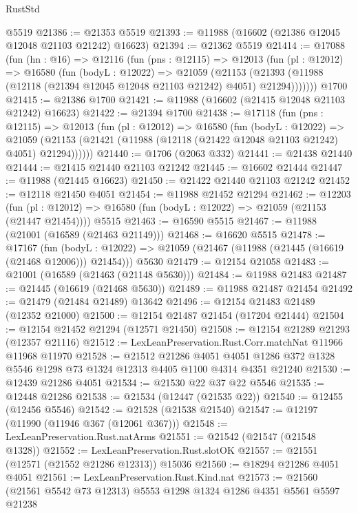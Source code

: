 \begin{lexlean}{RustStd}
\begin{coremodule}
    @5519
@21386 := @21353 @5519
@21393 := @11988 (@16602 (@21386 @12045 @12048 @21103 @21242) @16623)
@21394 := @21362 @5519
@21414 := @17088
    (fun (hn : @16) =>
    @12116
      (fun (pns : @12115) =>
      @12013
        (fun (pl : @12012) =>
        @16580
          (fun (bodyL : @12022) =>
          @21059
            (@21153
              (@21393 (@11988 (@12118 (@21394 @12045 @12048 @21103 @21242) @4051) @21294)))))))
    @1700
@21415 := @21386 @1700
@21421 := @11988 (@16602 (@21415 @12048 @21103 @21242) @16623)
@21422 := @21394 @1700
@21438 := @17118
    (fun (pns : @12115) =>
    @12013
      (fun (pl : @12012) =>
      @16580
        (fun (bodyL : @12022) =>
        @21059 (@21153 (@21421 (@11988 (@12118 (@21422 @12048 @21103 @21242) @4051) @21294))))))
@21440 := @1706 (@2063 @332)
@21441 := @21438 @21440
@21444 := @21415 @21440 @21103 @21242
@21445 := @16602 @21444
@21447 := @11988 (@21445 @16623)
@21450 := @21422 @21440 @21103 @21242
@21452 := @12118 @21450 @4051
@21454 := @11988 @21452 @21294
@21462 := @12203
    (fun (pl : @12012) => @16580 (fun (bodyL : @12022) => @21059 (@21153 (@21447 @21454))))
    @5515
@21463 := @16590 @5515
@21467 := @11988 (@21001 (@16589 (@21463 @21149)))
@21468 := @16620 @5515
@21478 := @17167
    (fun (bodyL : @12022) => @21059 (@21467 (@11988 (@21445 (@16619 (@21468 @12006))) @21454)))
    @5630
@21479 := @12154 @21058
@21483 := @21001 (@16589 (@21463 (@21148 @5630)))
@21484 := @11988 @21483
@21487 := @21445 (@16619 (@21468 @5630))
@21489 := @11988 @21487 @21454
@21492 := @21479 (@21484 @21489) @13642
@21496 := @12154 @21483 @21489 (@12352 @21000)
@21500 := @12154 @21487 @21454 (@17204 @21444)
@21504 := @12154 @21452 @21294 (@12571 @21450)
@21508 := @12154 @21289 @21293 (@12357 @21116)
@21512 := LexLeanPreservation.Rust.Corr.matchNat @11966 @11968 @11970
@21528 := @21512
    @21286
    @4051
    @4051
    @1286
    @372
    @1328
    @5546
    @1298
    @73
    @1324
    @12313
    @4405
    @1100
    @4314
    @4351
    @21240
@21530 := @12439 @21286 @4051
@21534 := @21530 @22 @37 @22 @5546
@21535 := @12448 @21286
@21538 := @21534 (@12447 (@21535 @22))
@21540 := @12455 (@12456 @5546)
@21542 := @21528 (@21538 @21540)
@21547 := @12197 (@11990 (@11946 @367 (@12061 @367)))
@21548 := LexLeanPreservation.Rust.natArms
@21551 := @21542 (@21547 (@21548 @1328))
@21552 := LexLeanPreservation.Rust.slotOK
@21557 := @21551 (@12571 (@21552 @21286 @12313)) @15036
@21560 := @18294 @21286 @4051 @4051
@21561 := LexLeanPreservation.Rust.Kind.nat
@21573 := @21560 (@21561 @5542 @73 @12313) @5553 @1298 @1324 @1286 @4351 @5561 @5597 @21238

\end{coremodule}
\end{lexlean}
